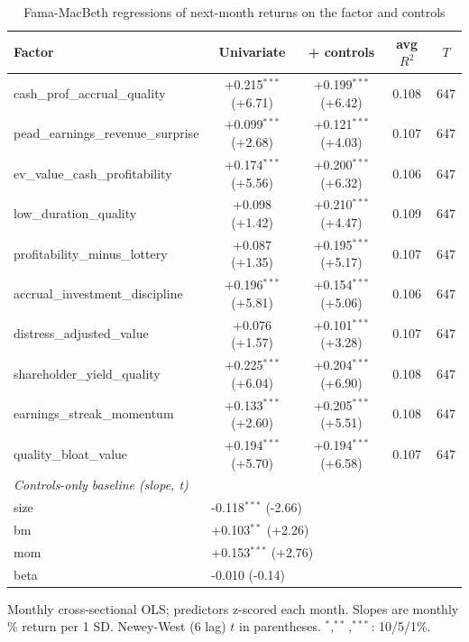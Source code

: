 \begin{table}[htbp]\centering
\caption{Fama-MacBeth regressions of next-month returns on the factor and controls}
\label{tab:fm}
\begin{threeparttable}\footnotesize
\begin{tabular}{lcccc}
\toprule
Factor & Univariate & + controls & avg $R^2$ & $T$ \\
\midrule
cash\_prof\_accrual\_quality & +0.215$^{***}$ (+6.71) & +0.199$^{***}$ (+6.42) & 0.108 & 647 \\
pead\_earnings\_revenue\_surprise & +0.099$^{***}$ (+2.68) & +0.121$^{***}$ (+4.03) & 0.107 & 647 \\
ev\_value\_cash\_profitability & +0.174$^{***}$ (+5.56) & +0.200$^{***}$ (+6.32) & 0.106 & 647 \\
low\_duration\_quality & +0.098 (+1.42) & +0.210$^{***}$ (+4.47) & 0.109 & 647 \\
profitability\_minus\_lottery & +0.087 (+1.35) & +0.195$^{***}$ (+5.17) & 0.107 & 647 \\
accrual\_investment\_discipline & +0.196$^{***}$ (+5.81) & +0.154$^{***}$ (+5.06) & 0.106 & 647 \\
distress\_adjusted\_value & +0.076 (+1.57) & +0.101$^{***}$ (+3.28) & 0.107 & 647 \\
shareholder\_yield\_quality & +0.225$^{***}$ (+6.04) & +0.204$^{***}$ (+6.90) & 0.108 & 647 \\
earnings\_streak\_momentum & +0.133$^{***}$ (+2.60) & +0.205$^{***}$ (+5.51) & 0.108 & 647 \\
quality\_bloat\_value & +0.194$^{***}$ (+5.70) & +0.194$^{***}$ (+6.58) & 0.107 & 647 \\
\midrule
\multicolumn{5}{l}{\textit{Controls-only baseline (slope, t)}} \\
size & \multicolumn{2}{l}{-0.118$^{***}$ (-2.66)} & & \\
bm & \multicolumn{2}{l}{+0.103$^{**}$ (+2.26)} & & \\
mom & \multicolumn{2}{l}{+0.153$^{***}$ (+2.76)} & & \\
beta & \multicolumn{2}{l}{-0.010 (-0.14)} & & \\
\bottomrule
\end{tabular}
\begin{tablenotes}\footnotesize
\item Monthly cross-sectional OLS; predictors z-scored each month. Slopes are monthly \% return per 1 SD. Newey-West (6 lag) $t$ in parentheses. $^{*},^{**},^{***}$: 10/5/1\%.
\end{tablenotes}
\end{threeparttable}
\end{table}